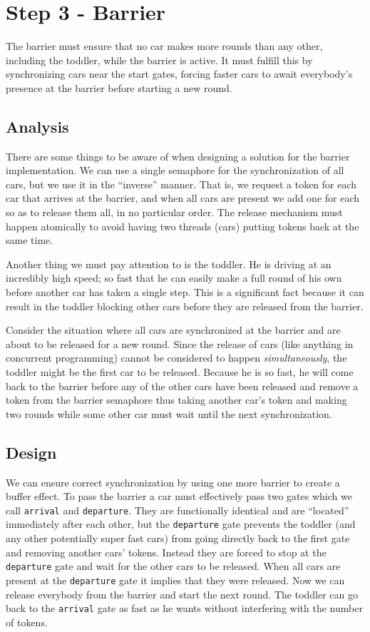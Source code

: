 \section*{Step 3 - Barrier}

The barrier must ensure that no car makes more rounds than any other, including the toddler, while the barrier is active. It must fulfill this by synchronizing cars near the start gates, forcing faster cars to await everybody's presence at the barrier before starting a new round.

\subsection*{Analysis}
There are some things to be aware of when designing a solution for the barrier implementation. We can use a single semaphore for the synchronization of all cars, but we use it in the ``inverse'' manner. That is, we request a token for each car that arrives at the barrier, and when all cars are present we add one for each so as to release them all, in no particular order. The release mechanism must happen atomically to avoid having two threads (cars) putting tokens back at the same time.

Another thing we must pay attention to is the toddler. He is driving at an incredibly high speed; so fast that he can easily make a full round of his own before another car has taken a single step. This is a significant fact because it can result in the toddler blocking other cars before they are released from the barrier.

Consider the situation where all cars are synchronized at the barrier and are about to be released for a new round. Since the release of cars (like anything in concurrent programming) cannot be considered to happen \emph{simultaneously}, the toddler might be the first car to be released. Because he is so fast, he will come back to the barrier before any of the other cars have been released and remove a token from the barrier semaphore thus taking another car's token and making two rounds while some other car must wait until the next synchronization.

\subsection*{Design}
We can ensure correct synchronization by using one more barrier to create a buffer effect. To pass the barrier a car must effectively pass two gates which we call \texttt{arrival} and \texttt{departure}. They are functionally identical and are ``located'' immediately after each other, but the \texttt{departure} gate prevents the toddler (and any other potentially super fast cars) from going directly back to the first gate and removing another cars' tokens. Instead they are forced to stop at the \texttt{departure} gate and wait for the other cars to be released. When all cars are present at the \texttt{departure} gate it implies that they were released. Now we can release everybody from the barrier and start the next round. The toddler can go back to the \texttt{arrival} gate as fast as he wants without interfering with the number of tokens.

